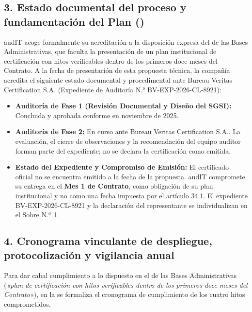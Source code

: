 \subsection*{3. Estado documental del proceso y fundamentación del Plan ()}
audIT acoge formalmente su acreditación a la disposición expresa del  de las Bases Administrativas, que faculta la presentación de un plan institucional de certificación con hitos verificables dentro de los primeros doce meses del Contrato. A la fecha de presentación de esta propuesta técnica, la compañía acredita el siguiente estado documental y procedimental ante Bureau Veritas Certification S.A. (Expediente de Auditoría N.° BV-EXP-2026-CL-8921):
\begin{itemize}
  \item \textbf{Auditoría de Fase 1 (Revisión Documental y Diseño del SGSI):} Concluida y aprobada conforme en noviembre de 2025.
  \item \textbf{Auditoría de Fase 2:} En curso ante Bureau Veritas Certification S.A.. La evaluación, el cierre de observaciones y la recomendación del equipo auditor forman parte del expediente; no se declara la certificación como emitida.
  \item \textbf{Estado del Expediente y Compromiso de Emisión:} El certificado oficial no se encuentra emitido a la fecha de la propuesta. audIT compromete su entrega en el \textbf{Mes 1 de Contrato}, como obligación de su plan institucional y no como una fecha impuesta por el artículo 34.1. El expediente BV-EXP-2026-CL-8921 y la declaración del representante se individualizan en el Sobre N.º 1.
\end{itemize}

\subsection*{4. Cronograma vinculante de despliegue, protocolización y vigilancia anual}
Para dar cabal cumplimiento a lo dispuesto en el  de las Bases Administrativas (\textit{«plan de certificación con hitos verificables dentro de los primeros doce meses del Contrato»}), en la  se formaliza el cronograma de cumplimiento de los cuatro hitos comprometidos.

